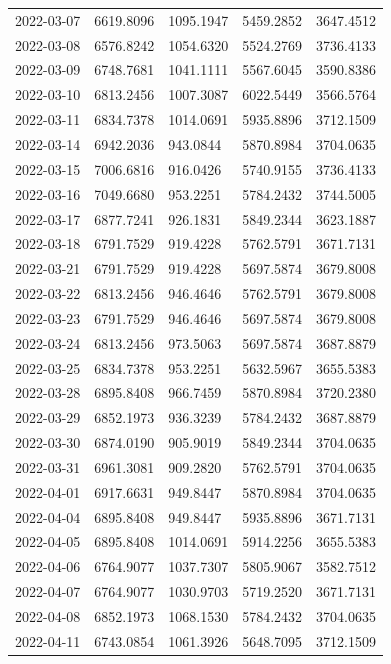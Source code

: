 {\begin{longtable}{lllll}
2022-03-07 & 6619.8096 & 1095.1947 & 5459.2852 & 3647.4512 \\
2022-03-08 & 6576.8242 & 1054.6320 & 5524.2769 & 3736.4133 \\
2022-03-09 & 6748.7681 & 1041.1111 & 5567.6045 & 3590.8386 \\
2022-03-10 & 6813.2456 & 1007.3087 & 6022.5449 & 3566.5764 \\
2022-03-11 & 6834.7378 & 1014.0691 & 5935.8896 & 3712.1509 \\
2022-03-14 & 6942.2036 & 943.0844 & 5870.8984 & 3704.0635 \\
2022-03-15 & 7006.6816 & 916.0426 & 5740.9155 & 3736.4133 \\
2022-03-16 & 7049.6680 & 953.2251 & 5784.2432 & 3744.5005 \\
2022-03-17 & 6877.7241 & 926.1831 & 5849.2344 & 3623.1887 \\
2022-03-18 & 6791.7529 & 919.4228 & 5762.5791 & 3671.7131 \\
2022-03-21 & 6791.7529 & 919.4228 & 5697.5874 & 3679.8008 \\
2022-03-22 & 6813.2456 & 946.4646 & 5762.5791 & 3679.8008 \\
2022-03-23 & 6791.7529 & 946.4646 & 5697.5874 & 3679.8008 \\
2022-03-24 & 6813.2456 & 973.5063 & 5697.5874 & 3687.8879 \\
2022-03-25 & 6834.7378 & 953.2251 & 5632.5967 & 3655.5383 \\
2022-03-28 & 6895.8408 & 966.7459 & 5870.8984 & 3720.2380 \\
2022-03-29 & 6852.1973 & 936.3239 & 5784.2432 & 3687.8879 \\
2022-03-30 & 6874.0190 & 905.9019 & 5849.2344 & 3704.0635 \\
2022-03-31 & 6961.3081 & 909.2820 & 5762.5791 & 3704.0635 \\
2022-04-01 & 6917.6631 & 949.8447 & 5870.8984 & 3704.0635 \\
2022-04-04 & 6895.8408 & 949.8447 & 5935.8896 & 3671.7131 \\
2022-04-05 & 6895.8408 & 1014.0691 & 5914.2256 & 3655.5383 \\
2022-04-06 & 6764.9077 & 1037.7307 & 5805.9067 & 3582.7512 \\
2022-04-07 & 6764.9077 & 1030.9703 & 5719.2520 & 3671.7131 \\
2022-04-08 & 6852.1973 & 1068.1530 & 5784.2432 & 3704.0635 \\
2022-04-11 & 6743.0854 & 1061.3926 & 5648.7095 & 3712.1509 \\

\end{longtable}}
